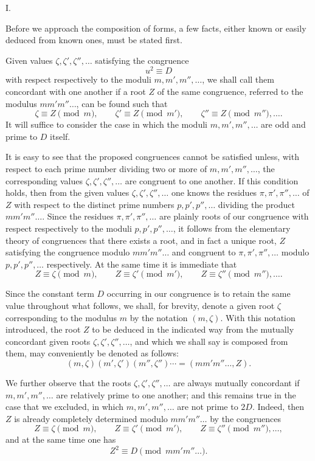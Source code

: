\documentclass[11pt]{article}
\begin{document}
\begin{center}I.\end{center}

Before we approach the composition of forms, a few facts, either known or easily deduced from known ones, must be stated first.

Given values $\zeta,\zeta',\zeta'',\ldots$ satisfying the congruence
\[
 u^2\equiv D
\]
with respect respectively to the moduli $m,m',m'',\ldots$, we shall call them concordant with one another if a root $Z$ of the same congruence, referred to the modulus $mm'm''\ldots$, can be found such that
\[
 \zeta\equiv Z\pmod m,\qquad \zeta'\equiv Z\pmod {m'},\qquad \zeta''\equiv Z\pmod {m''},\ldots.
\]
It will suffice to consider the case in which the moduli $m,m',m'',\ldots$ are odd and prime to $D$ itself.

It is easy to see that the proposed congruences cannot be satisfied unless, with respect to each prime number dividing two or more of $m,m',m'',\ldots$, the corresponding values $\zeta,\zeta',\zeta'',\ldots$ are congruent to one another. If this condition holds, then from the given values $\zeta,\zeta',\zeta'',\ldots$ one knows the residues $\pi,\pi',\pi'',\ldots$ of $Z$ with respect to the distinct prime numbers $p,p',p'',\ldots$ dividing the product $mm'm''\ldots$. Since the residues $\pi,\pi',\pi'',\ldots$ are plainly roots of our congruence with respect respectively to the moduli $p,p',p'',\ldots$, it follows from the elementary theory of congruences that there exists a root, and in fact a unique root, $Z$ satisfying the congruence modulo $mm'm''\ldots$ and congruent to $\pi,\pi',\pi'',\ldots$ modulo $p,p',p'',\ldots$ respectively. At the same time it is immediate that
\[
 Z\equiv\zeta\pmod m,\qquad Z\equiv\zeta'\pmod {m'},\qquad Z\equiv\zeta''\pmod {m''},\ldots.
\]

Since the constant term $D$ occurring in our congruence is to retain the same value throughout what follows, we shall, for brevity, denote a given root $\zeta$ corresponding to the modulus $m$ by the notation $(m,\zeta)$. With this notation introduced, the root $Z$ to be deduced in the indicated way from the mutually concordant given roots $\zeta,\zeta',\zeta'',\ldots$, and which we shall say is composed from them, may conveniently be denoted as follows:
\[
 (m,\zeta)(m',\zeta')(m'',\zeta'')\cdots=(mm'm''\ldots,Z).
\]

We further observe that the roots $\zeta,\zeta',\zeta'',\ldots$ are always mutually concordant if $m,m',m'',\ldots$ are relatively prime to one another; and this remains true in the case that we excluded, in which $m,m',m'',\ldots$ are not prime to $2D$. Indeed, then $Z$ is already completely determined modulo $mm'm''\ldots$ by the congruences
\[
 Z\equiv\zeta\pmod m,\qquad Z\equiv\zeta'\pmod {m'},\qquad Z\equiv\zeta''\pmod {m''},\ldots,
\]
and at the same time one has
\[
 Z^2\equiv D\pmod {mm'm''\ldots}.
\]
\end{document}
